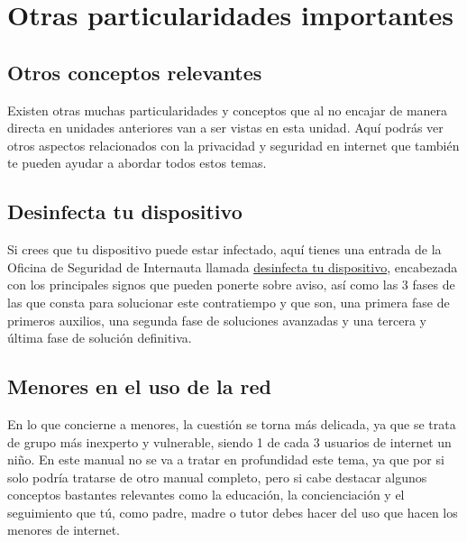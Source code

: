 \documentclass[
  a4paper,
  openany]{book}
\begin{document}
\hypertarget{otras-particularidades-importantes}{%
\chapter{Otras particularidades importantes}\label{otras-particularidades-importantes}}

\hypertarget{otros-conceptos-relevantes}{%
\section{Otros conceptos relevantes}\label{otros-conceptos-relevantes}}

Existen otras muchas particularidades y conceptos que al no encajar de manera directa en unidades anteriores van a ser vistas en esta unidad. Aquí podrás ver otros aspectos relacionados con la privacidad y seguridad en internet que también te pueden ayudar a abordar todos estos temas.

\hypertarget{desinfecta-tu-dispositivo}{%
\section{Desinfecta tu dispositivo}\label{desinfecta-tu-dispositivo}}

Si crees que tu dispositivo puede estar infectado, aquí tienes una entrada de la Oficina de Seguridad de Internauta llamada \href{https://www.osi.es/es/desinfecta-tu-ordenador}{desinfecta tu dispositivo}, encabezada con los principales signos que pueden ponerte sobre aviso, así como las 3 fases de las que consta para solucionar este contratiempo y que son, una primera fase de primeros auxilios, una segunda fase de soluciones avanzadas y una tercera y última fase de solución definitiva.

\hypertarget{menores-en-el-uso-de-la-red}{%
\section{Menores en el uso de la red}\label{menores-en-el-uso-de-la-red}}

En lo que concierne a menores, la cuestión se torna más delicada, ya que se trata de grupo más inexperto y vulnerable, siendo 1 de cada 3 usuarios de internet un niño. En este manual no se va a tratar en profundidad este tema, ya que por si solo podría tratarse de otro manual completo, pero si cabe destacar algunos conceptos bastantes relevantes como la educación, la concienciación y el seguimiento que tú, como padre, madre o tutor debes hacer del uso que hacen los menores de internet.
\end{document}
